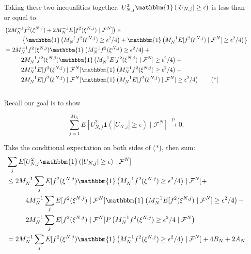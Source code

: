 \documentclass{article}
\begin{document}
Taking these two inequalities together, $U_{N,j}^2 \mathbbm{1} \left( |U_{N,j}| \ge \epsilon \right)$ is less than or equal to 
\begin{align*}
&\left(2M_N^{-1}f^2(\xi^{N,j}) + 2M_N^{-1} E[f^2(\xi^{N,j}) \mid \mathcal{F}^N]\right) \times \\
&\hspace{10mm}\left\{
\mathbbm{1} \left( M_N^{-1}f^2(\xi^{N,j}) \ge \epsilon^2/4 \right) + \mathbbm{1}\left( M_N^{-1} E[f^2(\xi^{N,j}) \mid \mathcal{F}^N] \ge \epsilon^2/4 \right)
\right\} \\
&= 
2M_N^{-1}f^2(\xi^{N,j})  \mathbbm{1} \left( M_N^{-1}f^2(\xi^{N,j}) \ge \epsilon^2/4 \right) + \\
&\hspace{10mm} 2M_N^{-1}f^2(\xi^{N,j})  \mathbbm{1}\left( M_N^{-1} E[f^2(\xi^{N,j}) \mid \mathcal{F}^N] \ge \epsilon^2/4 \right) +  \\
&\hspace{10mm} 2M_N^{-1} E[f^2(\xi^{N,j}) \mid \mathcal{F}^N]  \mathbbm{1} \left( M_N^{-1}f^2(\xi^{N,j}) \ge \epsilon^2/4 \right) + \\
&\hspace{10mm}  2M_N^{-1} E[f^2(\xi^{N,j}) \mid \mathcal{F}^N] \mathbbm{1}\left( M_N^{-1} E[f^2(\xi^{N,j}) \mid \mathcal{F}^N] \ge \epsilon^2/4 \right) \tag{*}
\end{align*}

\subsection{}

Recall our goal is to show

$$
\sum_{j=1}^{M_N} E[U_{N,j}^2 \mathbf{1}\left( |U_{N,j}| \ge \epsilon \right) \mid \mathcal{F}^N] \overset{\text{p}}{\to} 0.
$$

Take the conditional expectation on both sides of (*), then sum: 
\begin{align*}
&\sum_j E[U_{N,j}^2 \mathbbm{1} \left( |U_{N,j}| \ge \epsilon \right) \mid \mathcal{F}^N  ] \\
&\le 
2  M_N^{-1} \sum_j E[f^2(\xi^{N,j})  \mathbbm{1} \left( M_N^{-1}f^2(\xi^{N,j}) \ge \epsilon^2/4 \right) \mid \mathcal{F}^N  ] + \\
&\hspace{10mm} 4M_N^{-1} \sum_j E[ f^2(\xi^{N,j}) \mid \mathcal{F}^N  ]  \mathbbm{1}\left( M_N^{-1} E[f^2(\xi^{N,j}) \mid \mathcal{F}^N] \ge \epsilon^2/4 \right) +  \\
&\hspace{10mm} 2M_N^{-1} \sum_j E[f^2(\xi^{N,j}) \mid \mathcal{F}^N]  P \left( M_N^{-1}f^2(\xi^{N,j}) \ge \epsilon^2/4  \mid \mathcal{F}^N  \right) \\
&=2  M_N^{-1} \sum_j E[f^2(\xi^{N,j})  \mathbbm{1} \left( M_N^{-1}f^2(\xi^{N,j}) \ge \epsilon^2/4 \right) \mid \mathcal{F}^N  ] + 4B_N + 2 A_N 
\end{align*}
\end{document}

